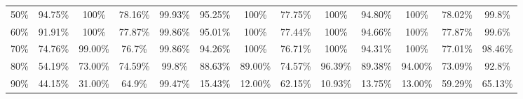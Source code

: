 \begin{table}
{\begin{tabular}{|c|cc|cc|cc|cc|cc|cc|}
50\%                       & 94.75\%                   & {\color[HTML]{036400} 100\%}   & 78.16\%                   & 99.93\% & 95.25\%                   & 100\%                          & 77.75\%                   & 100\%   & 94.80\%                   & 100\%                          & 78.02\%                   & 99.8\%  \\
60\%                       & 91.91\%                   & {\color[HTML]{036400} 100\%}   & 77.87\%                   & 99.86\% & 95.01\%                   & 100\%                          & 77.44\%                   & 100\%   & 94.66\%                   & 100\%                          & 77.87\%                   & 99.6\%  \\
70\%                       & 74.76\%                   & {\color[HTML]{CB0000} 99.00\%} & 76.7\%                    & 99.86\% & 94.26\%                   & 100\%                          & 76.71\%                   & 100\%   & 94.31\%                   & 100\%                          & 77.01\%                   & 98.46\% \\
80\%                       & 54.19\%                   & {\color[HTML]{CB0000} 73.00\%} & 74.59\%                   & 99.8\%  & 88.63\%                   & {\color[HTML]{CB0000} 89.00\%} & 74.57\%                   & 96.39\% & 89.38\%                   & {\color[HTML]{036400} 94.00\%} & 73.09\%                   & 92.8\%  \\
90\%                       & 44.15\%                   & {\color[HTML]{CB0000} 31.00\%} & 64.9\%                    & 99.47\% & 15.43\%                   & {\color[HTML]{036400} 12.00\%} & 62.15\%                   & 10.93\% & 13.75\%                   & {\color[HTML]{CB0000} 13.00\%} & 59.29\%                   & 65.13\% \\ \hline
\end{tabular}
}
\end{table}